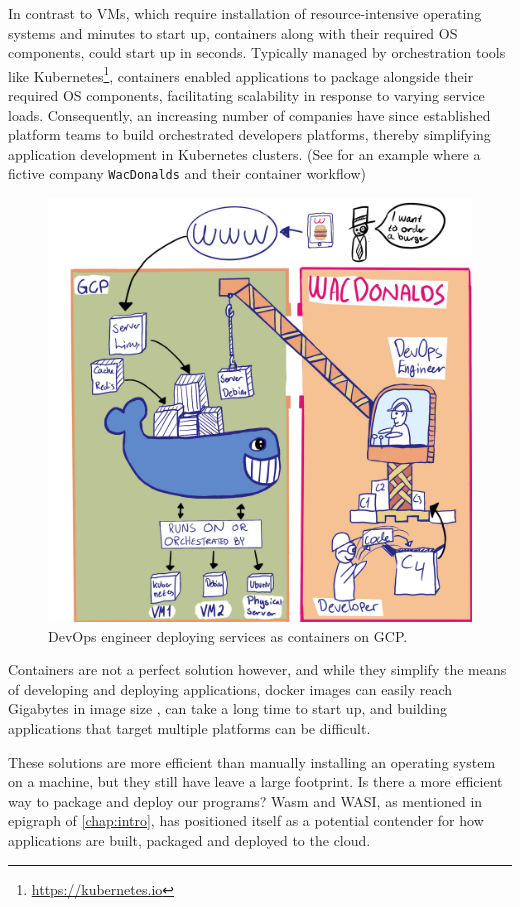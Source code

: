 \documentclass[
  table]{report}
\begin{document}
In contrast to VMs, which require installation of resource-intensive
operating systems and minutes to start up, containers along with their
required OS components, could start up in seconds. Typically managed by
orchestration tools like Kubernetes\footnote{\url{https://kubernetes.io}},
containers enabled applications to package alongside their required OS
components, facilitating scalability in response to varying service
loads. Consequently, an increasing number of companies have since
established platform teams to build orchestrated developers platforms,
thereby simplifying application development in Kubernetes clusters. (See
 for an example where a fictive company
\texttt{WacDonalds} and their container workflow)

\begin{figure}[H]
\centering
  \includegraphics[width=0.8\columnwidth]{assets/docker-wave.jpg}
  \caption{DevOps engineer deploying services as containers on \ac{GCP}.}
  \label{fig:docker}
\end{figure}

Containers are not a perfect solution however, and while they simplify
the means of developing and deploying applications, docker images can
easily reach Gigabytes in image size \citep{durieux2023}, can take a
long time to start up, and building applications that target multiple
platforms can be difficult.

These solutions are more efficient than manually installing an operating
system on a machine, but they still have leave a large footprint. Is
there a more efficient way to package and deploy our programs? \ac{Wasm}
and \ac{WASI}, as mentioned in epigraph of \cref{chap:intro}, has
positioned itself as a potential contender for how applications are
built, packaged and deployed to the cloud.
\end{document}
